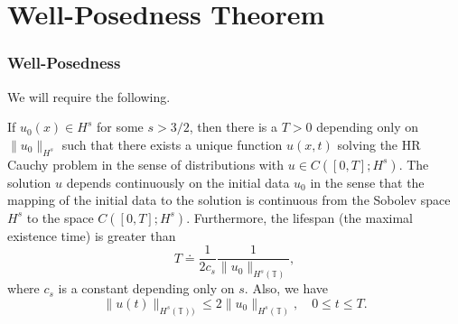 \documentclass{beamer}
\newcommand{\ci}{\mathbb{T}}
\begin{document}
\section{Well-Posedness Theorem}
\begin{frame}
	\frametitle{Well-Posedness}
We will require the following.
\begin{theorem}
\label{hr-wp}
If $u_0(x) \in  H^s$ for some $s >3/2$,  then there is  a $T>0$
depending only on  $\|u_0\|_{H^s}$ such that there exists a unique
function $u(x, t)$ solving  the HR Cauchy problem
in the sense of distributions with  $u \in C([0, T]; H^s)$.
The solution $u$ depends continuously on the initial data $u_0$
in the sense that the mapping of the initial data to the solution 
is continuous from the Sobolev space $H^s$ to the space $C([0, T]; H^s)$.
Furthermore, the  lifespan (the maximal existence time)
 is greater than 
%
     \begin{equation*}
   T
   \doteq
   \frac{1}{2c_s}
   \frac{1}{ \|u_0 \|_{H^s(\ci)}},
 \end{equation*}
%
where $c_s$  is a constant depending only on $s$.
Also, we have 
%
  \begin{equation*}
   \label{u-u0-Hs-bound}
\|u(t)\|_{H^s(\ci))}
  \le
  2
  \|u_0 \|_{H^s(\ci)},
  \quad
  0\le t \le T.
   \end{equation*}
\end{theorem}
\end{frame}
%
%
%
\end{document}
